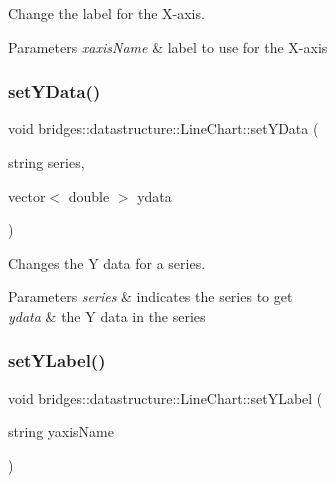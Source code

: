 Change the label for the X-\/axis. 


\begin{DoxyParams}{Parameters}
{\em xaxis\+Name} & label to use for the X-\/axis \\
\hline
\end{DoxyParams}
\mbox{\label{classbridges_1_1datastructure_1_1_line_chart_a861370f3f7b32cc1a9347727d084d307}} 
\subsubsection{\texorpdfstring{setYData()}{setYData()}}
{\footnotesize\ttfamily void bridges\+::datastructure\+::\+Line\+Chart\+::set\+Y\+Data (\begin{DoxyParamCaption}\item[{string}]{series,  }\item[{vector$<$ double $>$}]{ydata }\end{DoxyParamCaption})\hspace{0.3cm}{\ttfamily [inline]}}



Changes the Y data for a series. 


\begin{DoxyParams}{Parameters}
{\em series} & indicates the series to get \\
\hline
{\em ydata} & the Y data in the series \\
\hline
\end{DoxyParams}
\mbox{\label{classbridges_1_1datastructure_1_1_line_chart_ac41be5abf80052f1ace777072845a9d0}} 
\subsubsection{\texorpdfstring{setYLabel()}{setYLabel()}}
{\footnotesize\ttfamily void bridges\+::datastructure\+::\+Line\+Chart\+::set\+Y\+Label (\begin{DoxyParamCaption}\item[{string}]{yaxis\+Name }\end{DoxyParamCaption})\hspace{0.3cm}{\ttfamily [inline]}}



